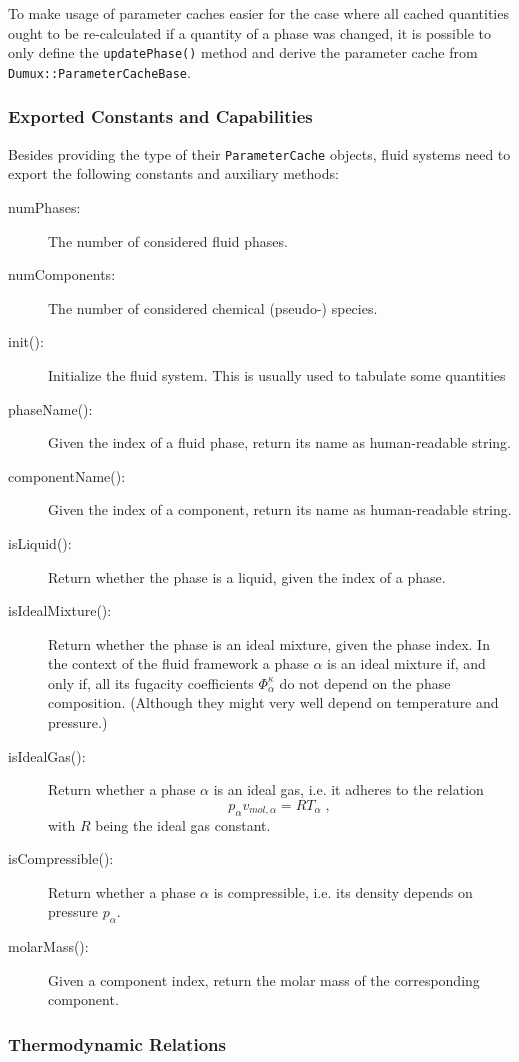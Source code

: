To make usage of parameter caches easier for the case where all cached
quantities ought to be re-calculated if a quantity of a phase was
changed, it is possible to only define the \texttt{updatePhase()}
method and derive the parameter cache from
\texttt{Dumux::ParameterCacheBase}.

\subsubsection{Exported Constants and Capabilities}

Besides providing the type of their \texttt{ParameterCache} objects,
fluid systems need to export the following constants and auxiliary
methods:
\begin{description}
\item[numPhases:] The number of considered fluid phases.
\item[numComponents:] The number of considered chemical (pseudo-)
  species.
\item[init():] Initialize the fluid system. This is usually used to
  tabulate some quantities
\item[phaseName():] Given the index of a fluid phase, return its name
  as human-readable string.
\item[componentName():] Given the index of a component, return its
  name as human-readable string.
\item[isLiquid():] Return whether the phase is a liquid, given the
  index of a phase.
\item[isIdealMixture():] Return whether the phase is an ideal mixture,
  given the phase index. In the context of the \Dumux fluid
  framework a phase $\alpha$ is an ideal mixture if, and only if, all
  its fugacity coefficients $\Phi^\kappa_\alpha$ do not depend on the
  phase composition. (Although they might very well depend on
  temperature and pressure.)
\item[isIdealGas():] Return whether a phase $\alpha$ is an ideal gas,
  i.e. it adheres to the relation
  \[
  p_\alpha v_{mol,\alpha} = R T_\alpha \;,
  \]
  with $R$ being the ideal gas constant.
\item[isCompressible():] Return whether a phase $\alpha$ is
  compressible, i.e. its density depends on pressure $p_\alpha$.
\item[molarMass():] Given a component index, return the molar mass of
  the corresponding component.
\end{description}

\subsubsection{Thermodynamic Relations}

